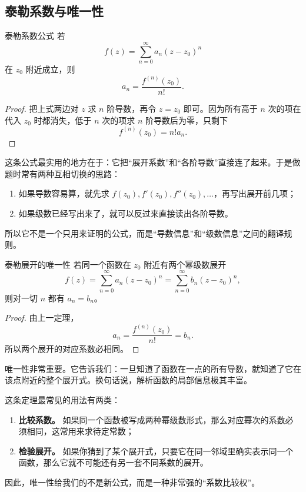 \subsection{泰勒系数与唯一性}

\begin{dingli}{泰勒系数公式}{}
若
\[
    f(z)=\sum_{n=0}^{\infty} a_n (z-z_0)^n
\]
在 $z_0$ 附近成立，则
\[
    a_n = \frac{f^{(n)}(z_0)}{n!}.
\]
\end{dingli}

\begin{proof}
把上式两边对 $z$ 求 $n$ 阶导数，再令 $z=z_0$ 即可。因为所有高于 $n$ 次的项在代入 $z_0$ 时都消失，低于 $n$ 次的项求 $n$ 阶导数后为零，只剩下
\[
    f^{(n)}(z_0)=n!a_n.
\]
\end{proof}

\begin{tishi}[泰勒系数公式怎么用]
这条公式最实用的地方在于：它把``展开系数''和``各阶导数''直接连了起来。于是做题时常有两种互相切换的思路：
\begin{enumerate}
    \item 如果导数容易算，就先求 $f(z_0),f'(z_0),f''(z_0),\ldots$，再写出展开前几项；
    \item 如果级数已经写出来了，就可以反过来直接读出各阶导数。
\end{enumerate}
所以它不是一个只用来证明的公式，而是``导数信息''和``级数信息''之间的翻译规则。
\end{tishi}

\begin{dingli}{泰勒展开的唯一性}{}
若同一个函数在 $z_0$ 附近有两个幂级数展开
\[
    f(z)=\sum_{n=0}^{\infty} a_n (z-z_0)^n
    =\sum_{n=0}^{\infty} b_n (z-z_0)^n,
\]
则对一切 $n$ 都有 $a_n=b_n$。
\end{dingli}

\begin{proof}
由上一定理，
\[
    a_n=\frac{f^{(n)}(z_0)}{n!}=b_n.
\]
所以两个展开的对应系数必相同。
\end{proof}

\begin{zhu}{}{}
唯一性非常重要。它告诉我们：一旦知道了函数在一点的所有导数，就知道了它在该点附近的整个展开式。换句话说，解析函数的局部信息极其丰富。
\end{zhu}

\begin{tishi}[唯一性在做题里怎么发挥作用]
这条定理最常见的用法有两类：
\begin{enumerate}
    \item \textbf{比较系数。} 如果同一个函数被写成两种幂级数形式，那么对应幂次的系数必须相同，这常用来求待定常数；
    \item \textbf{检验展开。} 如果你猜到了某个展开式，只要它在同一邻域里确实表示同一个函数，那么它就不可能还有另一套不同系数的展开。
\end{enumerate}
因此，唯一性给我们的不是新公式，而是一种非常强的``系数比较权''。
\end{tishi}

